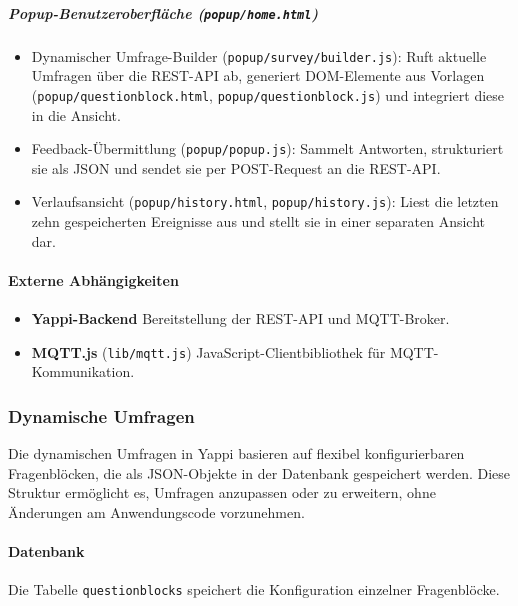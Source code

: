\documentclass[12pt,a4paper]{report}
\begin{document}
    \subparagraph{Popup-Benutzeroberfläche (\texttt{popup/home.html})}
        \begin{itemize}
          \item Dynamischer Umfrage-Builder (\texttt{popup/survey/builder.js}):
                Ruft aktuelle Umfragen über die REST-API ab, generiert DOM-Elemente aus Vorlagen (\texttt{popup/questionblock.html},
                \texttt{popup/questionblock.js}) und integriert diese in die Ansicht.
          \item Feedback-Übermittlung (\texttt{popup/popup.js}):
                Sammelt Antworten, strukturiert sie als JSON und sendet sie per POST-Request an die REST-API.
          \item Verlaufsansicht (\texttt{popup/history.html}, \texttt{popup/history.js}):
                Liest die letzten zehn gespeicherten Ereignisse aus und stellt sie in einer separaten Ansicht dar.
        \end{itemize}

\paragraph{Externe Abhängigkeiten}
    \begin{itemize}
      \item \textbf{Yappi-Backend} Bereitstellung der REST-API und MQTT-Broker.
      \item \textbf{MQTT.js} (\texttt{lib/mqtt.js}) JavaScript-Clientbibliothek für MQTT-Kommunikation.
    \end{itemize}

\subsubsection{Dynamische Umfragen}
    Die dynamischen Umfragen in Yappi basieren auf flexibel konfigurierbaren Fragenblöcken, die als JSON-Objekte in der Datenbank gespeichert werden.
    Diese Struktur ermöglicht es, Umfragen anzupassen oder zu erweitern, ohne Änderungen am Anwendungscode vorzunehmen.

\paragraph{Datenbank}
    Die Tabelle \texttt{questionblocks} speichert die Konfiguration einzelner Fragenblöcke.
\end{document}
